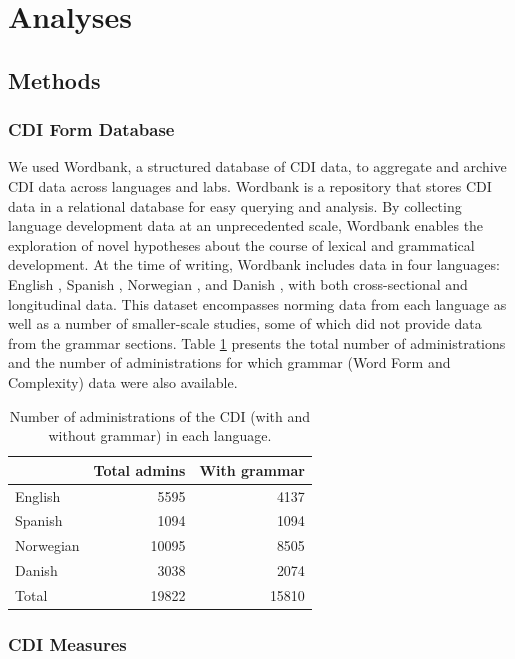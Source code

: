 \documentclass[10pt,letterpaper]{article}
\begin{document}
\section{Analyses}

\subsection{Methods}

\subsubsection{CDI Form Database}

We used Wordbank, a structured database of CDI data, to aggregate and archive CDI data across languages and labs. Wordbank is a repository that stores CDI data in a relational database for easy querying and analysis. By collecting language development data at an unprecedented scale, Wordbank enables the exploration of novel hypotheses about the course of lexical and grammatical development. At the time of writing, Wordbank includes data in four languages: English \cite{fenson2007}, Spanish \cite{jackson1993}, Norwegian \cite{simonsen2014}, and Danish \cite{bleses2008}, with both cross-sectional and longitudinal data. This dataset encompasses norming data from each language as well as a number of smaller-scale studies, some of which did not provide data from the grammar sections. Table \ref{table:num} presents the total number of administrations and the number of administrations for which grammar (Word Form and Complexity) data were also available.

\begin{table}
\begin{center}
\begin{tabular}{lrr}
\hline
& Total admins & With grammar\\ 
\hline
English & 5595 & 4137\\ 
Spanish & 1094 & 1094\\ 
Norwegian & 10095 & 8505\\ 
Danish & 3038 & 2074\\ 
\hline
Total & 19822 & 15810 \\
\hline
\end{tabular}
\end{center}
\caption{\label{table:num} Number of administrations of the CDI (with and without grammar) in each language.}
\end{table}

\subsubsection{CDI Measures}
\end{document}
